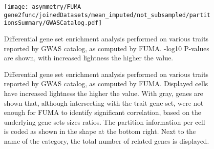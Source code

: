 \begin{figure}[H]
	\centering
	\texttt{[image: asymmetry/FUMA gene2func/joinedDatasets/mean\_imputed/not\_subsampled/partitionsSummary/GWASCatalog.pdf]}
	
	\caption[GWAS Catalog GSEA -log10P values]{Differential gene set enrichment analysis performed on various traits reported by GWAS catalog, as computed by FUMA. -log10 P-values are shown, with increased lightness the higher the value.}
	\label{fig:gw_catalog}
\end{figure}
\begin{figure}[H]
	\begin{adjustwidth}{-3cm}{-3cm}
	\centering
	\par\medskip
	\raggedleft
	\caption[GWAS Catalog GSEA genes]{Differential gene set enrichment analysis performed on various traits reported by GWAS catalog, as computed by FUMA. Displayed cells have increased lightness the higher the value. With gray, genes are shown that, although intersecting with the trait gene set, were not enough for FUMA to identify significant correlation, based on the underlying gene sets sizes ratios. The partition information per cell is coded as shown in the shape at the bottom right. Next to the name of the category, the total number of related genes is displayed.}
	\label{fig:gw_catalog_genes}
\end{adjustwidth}
\end{figure}